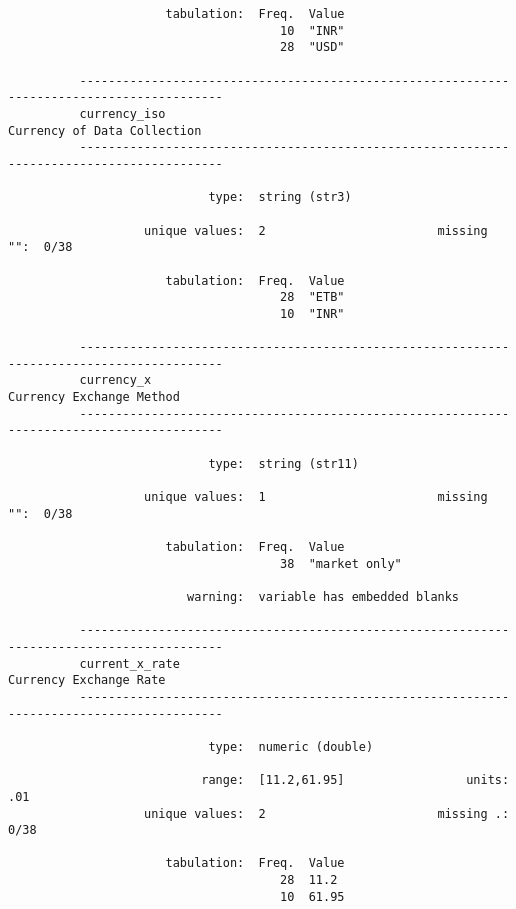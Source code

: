 \documentclass{article}
\begin{document}
\begin{verbatim}
                      tabulation:  Freq.  Value
                                      10  "INR"
                                      28  "USD"
          
          ------------------------------------------------------------------------------------------
          currency_iso                                                   Currency of Data Collection
          ------------------------------------------------------------------------------------------
          
                            type:  string (str3)
          
                   unique values:  2                        missing "":  0/38
          
                      tabulation:  Freq.  Value
                                      28  "ETB"
                                      10  "INR"
          
          ------------------------------------------------------------------------------------------
          currency_x                                                        Currency Exchange Method
          ------------------------------------------------------------------------------------------
          
                            type:  string (str11)
          
                   unique values:  1                        missing "":  0/38
          
                      tabulation:  Freq.  Value
                                      38  "market only"
          
                         warning:  variable has embedded blanks
          
          ------------------------------------------------------------------------------------------
          current_x_rate                                                      Currency Exchange Rate
          ------------------------------------------------------------------------------------------
          
                            type:  numeric (double)
          
                           range:  [11.2,61.95]                 units:  .01
                   unique values:  2                        missing .:  0/38
          
                      tabulation:  Freq.  Value
                                      28  11.2
                                      10  61.95
          

\end{verbatim}
\end{document}
